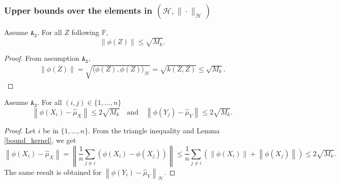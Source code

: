 \documentclass[twoside,11pt]{article}
\newcommand{\Hk}{\mathcal{H}}
\newcommand{\nb}{n}
\newcommand{\PP}{\mathbb{P}}%
\newcommand{\A}[1]{$\mathtt{A_#1}$}
\begin{document}
\subsubsection*{Upper bounds over the elements in $(\Hk,\|\cdot\|_{\Hk})$}
\begin{lemma}
\label{kernel_bound}
Assume \A{2}. For all $Z$ following $\PP$, 
\begin{equation*}
     \left \| \phi(Z) \right \| \leq \sqrt{M_k}.
\end{equation*}
\end{lemma}
\begin{proof}
From assumption \A{2},
\begin{align*}
    \left \| \phi(Z) \right \| = \sqrt{\langle \phi(Z),\phi(Z) \rangle_{\Hk}} = \sqrt{k(Z,Z)} \leq \sqrt{M_k}.
 \end{align*}
\end{proof}
\begin{lemma}
\label{bound_kernel}
Assume \A{2}. For all $(i,j) \in \{1,\ldots,\nb\}$ 
    \begin{equation*}
         \left \| \phi(X_i) - \widehat{\mu}_X \right \| \leq  2 \sqrt{M_k}  \quad \text{and} \quad \left \| \phi(Y_j) - \widehat{\mu}_Y \right \| \leq  2 \sqrt{M_k} .
   \end{equation*}
\end{lemma}
\begin{proof}
Let $i$ be in $\{1,\ldots,\nb\}$. From the triangle inequality and Lemma \ref{bound_kernel}, we get 
\begin{equation*}
\left \| \phi(X_i) - \widehat{\mu}_X \right \| =  \left \| \frac{1}{\nb}  \underset{j \neq i}      {\sum} \left( \phi(X_i) - \phi(X_j) \right) \right \| \leq  \frac{1}{\nb} \underset{j \neq i}
     {\sum} \left( \left \| \phi(X_i) \right \| + \left \| \phi(X_j) \right \| \right) \leq  2 \sqrt{M_k}.
\end{equation*}
The same result is obtained for $\left \|  \phi(Y_i) - \widehat{\mu}_Y \right \|_{\Hk}$. 
\end{proof}
\end{document}
